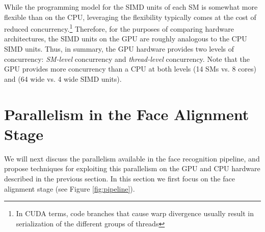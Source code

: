 \documentclass[preprint]{sigplanconf}
\begin{document}
While the programming model for
the SIMD units of each SM is somewhat more flexible than on the CPU,
leveraging the flexibility typically comes at the cost of reduced concurrency.\footnote{
In CUDA terms, code branches that cause warp divergence usually
result in serialization of the different groups of threads}  Therefore, for
the purposes of comparing hardware architectures, the SIMD units on the GPU are
roughly analogous to the CPU SIMD units. Thus, in summary, the GPU hardware 
provides two levels of concurrency: {\em SM-level}
concurrency and {\em thread-level} concurrency.  Note that the GPU provides more
concurrency than a CPU at both levels (14 SMs vs. 8 cores) and (64 wide vs. 4 wide SIMD
units).


\section{Parallelism in the Face Alignment Stage}
\label{sec:alignment}

We will next discuss the parallelism available in the face recognition
pipeline, and propose techniques for exploiting this parallelism on the GPU and CPU hardware 
described in the previous section.  In this section we first focus on the
face alignment stage (see Figure \ref{fig:pipeline}).
\end{document}
